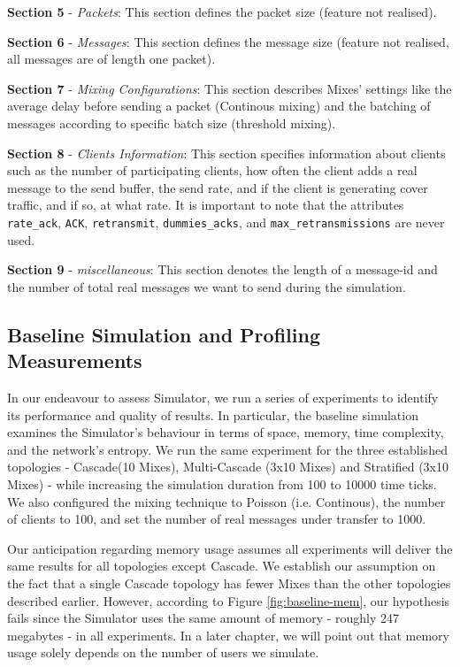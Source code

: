 \documentclass[logo,msc,cyber]{infthesis}   %
\begin{document}
\textbf{Section 5} - \emph{Packets}: This section defines the packet size
(feature not realised).

\textbf{Section 6} - \emph{Messages}: This section defines the message size
(feature not realised, all messages are of length one packet).

\textbf{Section 7} - \emph{Mixing Configurations}: This section describes Mixes'
settings like the average delay before sending a packet (Continous mixing) and
the batching of messages according to specific batch size (threshold mixing). 
    
\textbf{Section 8} - \emph{Clients Information}: This section specifies
information about clients such as the number of participating clients, how
often the client adds a real message to the send buffer, the send rate, and if
the client is generating cover traffic, and if so, at what rate. It is important
to note that the attributes \texttt{rate\_ack}, \texttt{ACK},
\texttt{retransmit}, \texttt{dummies\_acks}, and \texttt{max\_retransmissions}
are never used. 

\textbf{Section 9} - \emph{miscellaneous}: This section
denotes the length of a message-id and the number of total real messages we
want to send during the simulation.


\subsection{Baseline Simulation and Profiling Measurements}

In our endeavour to assess Simulator, we run a series of experiments to identify
its performance and quality of results. In particular, the baseline simulation
examines the Simulator's behaviour in terms of space, memory, time complexity,
and the network's entropy. We run the same experiment for the three established
topologies - Cascade(10 Mixes), Multi-Cascade (3x10 Mixes) and Stratified (3x10
Mixes) - while increasing the simulation duration from 100 to 10000 time ticks.
We also configured the mixing technique to Poisson (i.e. Continous), the number
of clients to 100, and set the number of real messages under transfer to 1000. 

Our anticipation regarding memory usage assumes all experiments will deliver the
same results for all topologies except Cascade. We establish our assumption on
the fact that a single Cascade topology has fewer Mixes than the other
topologies described earlier. However, according to Figure
\ref{fig:baseline-mem}, our hypothesis fails since the Simulator uses the same
amount of memory - roughly 247 megabytes - in all experiments. In a later
chapter, we will point out that memory usage solely depends on the number of
users we simulate.
\end{document}
